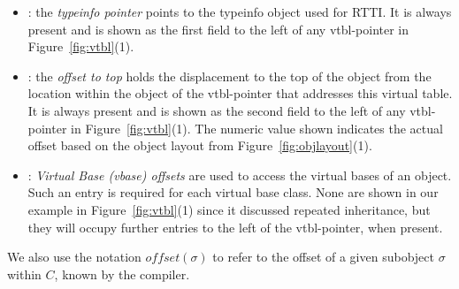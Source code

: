 \begin{itemize}
\setlength{\itemsep}{0pt}
\setlength{\parskip}{0pt}
\item {}: the \emph{typeinfo pointer} points to the typeinfo 
      object used for RTTI. It is always present and is shown as the first field 
      to the left of any vtbl-pointer in Figure~\ref{fig:vtbl}(1).
\item {}: the \emph{offset to top} holds the displacement to 
      the top of the object from the location within the object of the 
      vtbl-pointer that addresses this virtual table. It is always present and 
      is shown as the second field to the left of any vtbl-pointer in 
      Figure~\ref{fig:vtbl}(1). The numeric value shown indicates the actual 
      offset based on the object layout from Figure~\ref{fig:objlayout}(1).
\item {}: \emph{Virtual Base (vbase) offsets} are used to access 
      the virtual bases of an object. Such an entry is required for each virtual 
      base class. None are shown in our example in Figure~\ref{fig:vtbl}(1) 
      since it discussed repeated inheritance, but they will occupy further 
      entries to the left of the vtbl-pointer, when present.
\end{itemize}

\noindent
We also use the notation $\mathit{offset}(\sigma)$ to refer to the offset of a 
given subobject $\sigma$ within $C$, known by the compiler.

